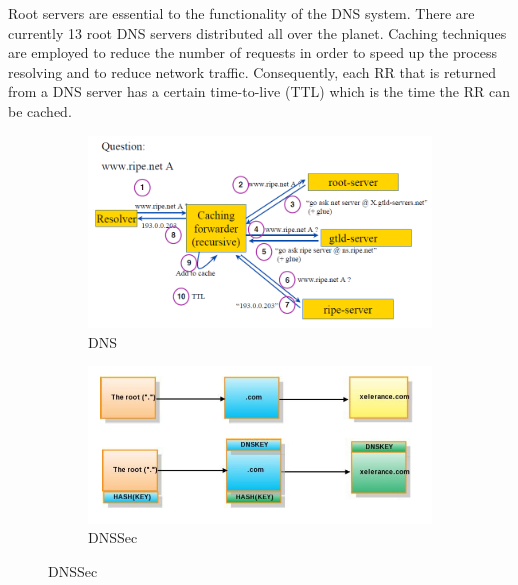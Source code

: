 \documentclass[12pt]{article}
\begin{document}
Root servers are essential to the functionality of the DNS
system. There are currently 13 root DNS servers distributed
all over the planet. Caching techniques are employed to
reduce the number of requests in order to speed up the process resolving and to reduce network traffic. Consequently,
each RR that is returned from a DNS server has a certain
time-to-live (TTL) which is the time the RR can be cached.
\begin{figure}[h!]
        \centering
        \begin{subfigure}[b]{0.45\textwidth}
                \centering
                \includegraphics[width=\textwidth]{DNS.png}
                \caption{DNS}
                \end{subfigure}
        \qquad
        \begin{subfigure}[b]{0.45\textwidth}
                \centering
                \includegraphics[width=\textwidth]{DNSSec.png}
                \caption{DNSSec}
                \end{subfigure}
       \end{figure}
\end{document}
